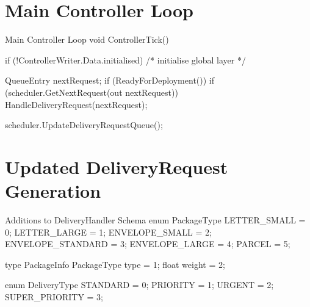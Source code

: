 \documentclass[a4paper,11pt,titlepage]{report}
\begin{document}
\begin{appendices}
\section{Main Controller Loop}
\begin{sexylisting}[colback=white]{Main Controller Loop}
void ControllerTick()
{
  if (!ControllerWriter.Data.initialised)
  {
    /* initialise global layer */
  }

  QueueEntry nextRequest;
  if (ReadyForDeployment())
  {
    if (scheduler.GetNextRequest(out nextRequest))
    {
      HandleDeliveryRequest(nextRequest);
    }
  }

  scheduler.UpdateDeliveryRequestQueue();
}
\end{sexylisting}

\section{Updated DeliveryRequest Generation}
\begin{sexylisting}[colback=white]{Additions to DeliveryHandler Schema}
enum PackageType {
  LETTER_SMALL = 0;
  LETTER_LARGE = 1;
  ENVELOPE_SMALL = 2;
  ENVELOPE_STANDARD = 3;
  ENVELOPE_LARGE = 4;
  PARCEL = 5;
}

type PackageInfo {
  PackageType type = 1;
  float weight = 2;
}

enum DeliveryType {
  STANDARD = 0;
  PRIORITY = 1;
  URGENT = 2;
  SUPER_PRIORITY = 3;
}
\end{sexylisting}

\end{appendices}
\end{document}
